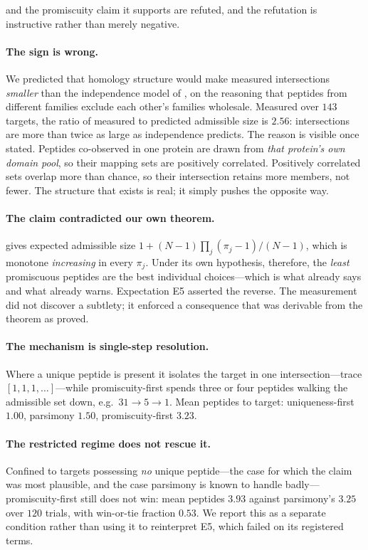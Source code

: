 \documentclass[11pt,a4paper]{article}
\theoremstyle{definition}
\theoremstyle{remark}
\begin{document}
 and the promiscuity claim it supports are refuted,
and the refutation is instructive rather than merely negative.

\paragraph{The sign is wrong.} We predicted that homology structure
would make measured intersections \emph{smaller} than the independence
model of , on the reasoning that peptides from
different families exclude each other's families wholesale. Measured
over $143$ targets, the ratio of measured to predicted admissible size
is $2.56$: intersections are more than twice as large as independence
predicts. The reason is visible once stated. Peptides co-observed in one
protein are drawn from \emph{that protein's own domain pool}, so their
mapping sets are positively correlated. Positively correlated sets
overlap more than chance, so their intersection retains more members,
not fewer. The structure that exists is real; it simply pushes the
opposite way.

\paragraph{The claim contradicted our own theorem.} 
gives expected admissible size
$1+(N-1)\prod_j(\pi_j-1)/(N-1)$, which is monotone \emph{increasing} in
every $\pi_j$. Under its own hypothesis, therefore, the \emph{least}
promiscuous peptides are the best individual choices---which is what
 already says and what 
already warns. Expectation E5 asserted the reverse. The measurement did
not discover a subtlety; it enforced a consequence that was derivable
from the theorem as proved.

\paragraph{The mechanism is single-step resolution.} Where a unique
peptide is present it isolates the target in one intersection---trace
$[1,1,1,\dots]$---while promiscuity-first spends three or four peptides
walking the admissible set down, e.g.\ $31\to5\to1$. Mean peptides to
target: uniqueness-first $1.00$, parsimony $1.50$, promiscuity-first
$3.23$.

\paragraph{The restricted regime does not rescue it.} Confined to
targets possessing \emph{no} unique peptide---the case for which the
claim was most plausible, and the case parsimony is known to handle
badly---promiscuity-first still does not win: mean peptides
$3.93$ against parsimony's $3.25$ over $120$ trials, with win-or-tie
fraction $0.53$. We report this as a separate condition rather than
using it to reinterpret E5, which failed on its registered terms.
\end{document}
